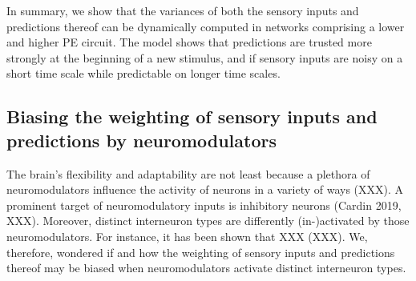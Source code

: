 \documentclass[10pt,a4paper]{article}
\begin{document}
In summary, we show that the variances of both the sensory inputs and predictions thereof can be dynamically computed in networks comprising a lower and higher PE circuit. The model shows that predictions are trusted more strongly at the beginning of a new stimulus, and if sensory inputs are noisy on a short time scale while predictable on longer time scales.


\subsection*{Biasing the weighting of sensory inputs and predictions by neuromodulators}
%
The brain's flexibility and adaptability are not least because a plethora of neuromodulators influence the activity of neurons in a variety of ways (XXX). A prominent target of neuromodulatory inputs is inhibitory neurons (Cardin 2019, XXX). Moreover, distinct interneuron types are differently (in-)activated by those neuromodulators. For instance, it has been shown that XXX (XXX). We, therefore, wondered if and how the weighting of sensory inputs and predictions thereof may be biased when neuromodulators activate distinct interneuron types.
%
\end{document}
